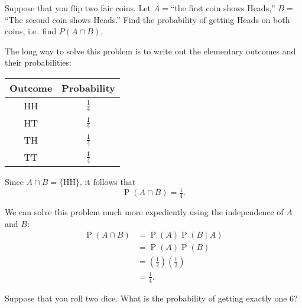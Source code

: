 \documentclass[answers,11pt]{exam}
\DeclareMathOperator*{\Prob}{P}
\renewcommand{\Pr}{\Prob}
\begin{document}
\begin{questions}
\begin{parts}
\begin{solution}
\end{solution}

\end{parts}

 \newpage
{}
\question Suppose that you flip two fair coins.  Let $A = $``the first coin shows
Heads,'' $B = $ ``The second coin shows Heads.''  Find the probability
of getting Heads on both coins, i.e.~find $P(A \cap B)$.

\begin{solution}
The long way to solve this problem is to write out the elementary outcomes and
their probabilities:

\vspace{1\baselineskip}
\begin{center}
\begin{tabular}{cc}
\toprule
Outcome & Probability \\
\midrule
HH & $\tfrac{1}{4}$ \\
HT & $\tfrac{1}{4}$ \\
TH & $\tfrac{1}{4}$ \\
TT & $\tfrac{1}{4}$ \\
\bottomrule
\end{tabular}
\end{center}
\vspace{1\baselineskip}

Since $A \cap B = \{ \text{HH} \}$, it follows that
\[
  \Pr(A \cap B) = \tfrac{1}{4}.
\]

We can solve this problem much more expediently using the independence of $A$
and $B$:
\begin{align*}
  \Pr(A \cap B)
  &= \Pr(A) \Pr(B \mid A) \\
  &= \Pr(A) \Pr(B) \\
  &= (\tfrac{1}{2}) (\tfrac{1}{2}) \\
  &= \tfrac{1}{4}.
\end{align*}

\end{solution}


\question Suppose that you roll two dice.  What is the probability of getting exactly
one 6?


\end{questions}
\end{document}
